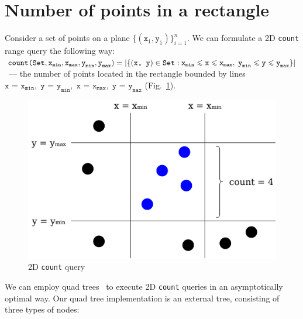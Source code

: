 \documentclass[times, dvipsnames,%
               languages={russian,english} %
              ]{itmo-student-thesis}
\begin{document}
\section{Number of points in a rectangle}

Consider a set of points on a plane $\{\left(\texttt{x}_\texttt{i}, \texttt{y}_\texttt{i} \right)\}_{i = 1}^{n}$. We can formulate a 2D \texttt{count} range query the following way: $\texttt{count(Set}, \texttt{x}_{\texttt{min}}, \texttt{x}_{\texttt{max}}, \texttt{y}_{\texttt{min}}, \texttt{y}_{\texttt{max}}) =\\ \vert \{\left( \texttt{x, y} \right) \in \texttt{Set} : \texttt{x}_{\texttt{min}} \leq \texttt{x} \leq \texttt{x}_{\texttt{max}}, \; \texttt{y}_{\texttt{min}} \leq \texttt{y} \leq \texttt{y}_{\texttt{max}}\} \vert$~--- the number of points located in the rectangle bounded by lines $\texttt{x = x}_{\texttt{min}}, \; \texttt{y = y}_{\texttt{min}}, \; \texttt{x = x}_{\texttt{max}}, \; \texttt{y = y}_{\texttt{max}}$ (Fig.~\ref{count-2d-pic}).

\begin{figure}[H]
  \centering
  \caption{2D \texttt{count} query}
  \label{count-2d-pic}
  \includegraphics[width=\linewidth]{pics/count-2d.png}
\end{figure}

We can employ quad trees~\cite{de2000computational} to execute 2D \texttt{count} queries in an asymptotically optimal way. Our quad tree implementation is an external tree, consisting of three types of nodes:
\end{document}
